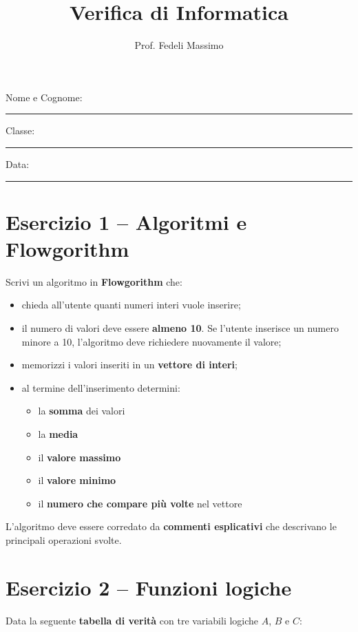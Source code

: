 \documentclass[a4paper,12pt]{article}
\title{Verifica di Informatica}
\author{Prof. Fedeli Massimo}
\date{}
\begin{document}
	
	\maketitle
	
	Nome e Cognome: \rule{8cm}{0.4pt}
	
	Classe: \rule{3cm}{0.4pt} \hfill Data: \rule{3cm}{0.4pt}
	
	\vspace{1cm}
	
	\section*{Esercizio 1 – Algoritmi e Flowgorithm}
	
	Scrivi un algoritmo in \textbf{Flowgorithm} che:
	
	\begin{itemize}
		\item chieda all'utente quanti numeri interi vuole inserire;
		\item il numero di valori deve essere \textbf{almeno 10}. Se l'utente inserisce un numero minore a 10, l'algoritmo deve richiedere nuovamente il valore;
		\item memorizzi i valori inseriti in un \textbf{vettore di interi};
		\item al termine dell'inserimento determini:
		\begin{itemize}
			\item la \textbf{somma} dei valori
			\item la \textbf{media}
			\item il \textbf{valore massimo}
			\item il \textbf{valore minimo}
			\item il \textbf{numero che compare più volte} nel vettore
		\end{itemize}
	\end{itemize}
	
	L'algoritmo deve essere corredato da \textbf{commenti esplicativi} che descrivano le principali operazioni svolte.
	
	\vspace{1cm}
	
	\section*{Esercizio 2 – Funzioni logiche}
	
	Data la seguente \textbf{tabella di verità} con tre variabili logiche \(A\), \(B\) e \(C\):
	
\end{document}

